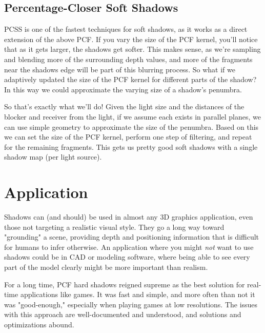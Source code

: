 \documentclass{article}
\begin{document}
\subsection{Percentage-Closer Soft Shadows}

PCSS is one of the fastest techniques for soft shadows, as it works as a direct extension of the above PCF. If you vary the size of the PCF kernel, you'll notice that as it gets larger, the shadows get softer. This makes sense, as we're sampling and blending more of the surrounding depth values, and more of the fragments near the shadows edge will be part of this blurring process. So what if we adaptively updated the size of the PCF kernel for different parts of the shadow? In this way we could approximate the varying size of a shadow's penumbra.

So that's exactly what we'll do! Given the light size and the distances of the blocker and receiver from the light, if we assume each exists in parallel planes, we can use simple geometry to approximate the size of the penumbra. Based on this we can set the size of the PCF kernel, perform one step of filtering, and repeat for the remaining fragments. This gets us pretty good soft shadows with a single shadow map (per light source).


\section{Application} %

Shadows can (and should) be used in almost any 3D graphics application, even those not targeting a realistic visual style. They go a long way toward "grounding" a scene, providing depth and positioning information that is difficult for humans to infer otherwise. An application where you might \emph{not} want to use shadows could be in CAD or modeling software, where being able to see every part of the model clearly might be more important than realism.

For a long time, PCF hard shadows reigned supreme as the best solution for real-time applications like games. It was fast and simple, and more often than not it was "good-enough," especially when playing games at low resolutions. The issues with this approach are well-documented and understood, and solutions and optimizations abound.
\end{document}
